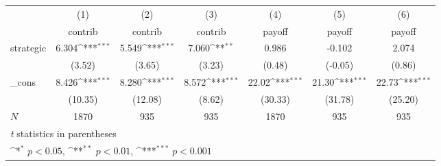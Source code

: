 {
\def\sym#1{\ifmmode^{#1}\else\(^{#1}\)\fi}
\begin{tabular}{l*{6}{c}}
\hline\hline
            &\multicolumn{1}{c}{(1)}&\multicolumn{1}{c}{(2)}&\multicolumn{1}{c}{(3)}&\multicolumn{1}{c}{(4)}&\multicolumn{1}{c}{(5)}&\multicolumn{1}{c}{(6)}\\
            &\multicolumn{1}{c}{contrib}&\multicolumn{1}{c}{contrib}&\multicolumn{1}{c}{contrib}&\multicolumn{1}{c}{payoff}&\multicolumn{1}{c}{payoff}&\multicolumn{1}{c}{payoff}\\
\hline
strategic   &       6.304\sym{***}&       5.549\sym{***}&       7.060\sym{**} &       0.986         &      -0.102         &       2.074         \\
            &      (3.52)         &      (3.65)         &      (3.23)         &      (0.48)         &     (-0.05)         &      (0.86)         \\
[1em]
\_cons      &       8.426\sym{***}&       8.280\sym{***}&       8.572\sym{***}&       22.02\sym{***}&       21.30\sym{***}&       22.73\sym{***}\\
            &     (10.35)         &     (12.08)         &      (8.62)         &     (30.33)         &     (31.78)         &     (25.20)         \\
\hline
\(N\)       &        1870         &         935         &         935         &        1870         &         935         &         935         \\
\hline\hline
\multicolumn{7}{l}{\footnotesize \textit{t} statistics in parentheses}\\
\multicolumn{7}{l}{\footnotesize \sym{*} \(p<0.05\), \sym{**} \(p<0.01\), \sym{***} \(p<0.001\)}\\
\end{tabular}
}
